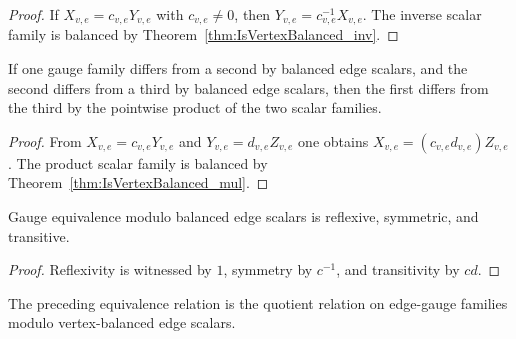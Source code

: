 \begin{proof}\leanok
    If $X_{v,e}=c_{v,e}Y_{v,e}$ with $c_{v,e}\ne 0$, then
    $Y_{v,e}=c_{v,e}^{-1}X_{v,e}$. The inverse scalar family is balanced by
    Theorem~\ref{thm:IsVertexBalanced_inv}.
\end{proof}

\begin{theorem}%
    \label{thm:GaugeEquivModEdgeScalars_trans}
    \leanok
    If one gauge family differs from a second by balanced edge scalars, and the
    second differs from a third by balanced edge scalars, then the first differs
    from the third by the pointwise product of the two scalar families.
    \begin{center}
        \TNPEPSEdgeGaugeOrientation
    \end{center}
\end{theorem}

\begin{proof}\leanok
    From $X_{v,e}=c_{v,e}Y_{v,e}$ and $Y_{v,e}=d_{v,e}Z_{v,e}$ one obtains
    $X_{v,e}=(c_{v,e}d_{v,e})Z_{v,e}$. The product scalar family is balanced
    by Theorem~\ref{thm:IsVertexBalanced_mul}.
\end{proof}

\begin{theorem}%
    \label{thm:GaugeEquivModEdgeScalars_equivalence}
    \leanok
    Gauge equivalence modulo balanced edge scalars is reflexive, symmetric,
    and transitive.
\end{theorem}

\begin{proof}\leanok
    Reflexivity is witnessed by $1$, symmetry by $c^{-1}$, and transitivity
    by $cd$.
\end{proof}

\begin{definition}%
    \label{def:GaugeEquivModEdgeScalars_setoid}
    \leanok
    The preceding equivalence relation is the quotient relation on edge-gauge
    families modulo vertex-balanced edge scalars.
\end{definition}

